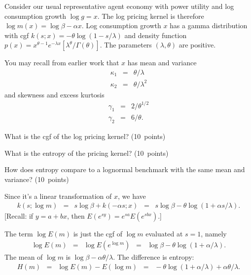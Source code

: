 \documentclass[11pt]{exam}
\begin{document}
\begin{questions}
\begin{solution}
\begin{parts}
\end{parts}
\end{solution}

Consider our usual representative agent economy with power utility
and log consumption growth $ \log g = x$.
The log pricing kernel is therefore $\log m(x) = \log \beta -\alpha x $.
Log consumption growth $x$ has a gamma distribution with
cgf $ k(s; x) = - \theta \log (1-s/\lambda) $
and
density function $p(x) = x^{\theta-1} e^{-\lambda x} [\lambda^\theta/\Gamma(\theta)] $.
The parameters $(\lambda,\theta)$ are positive.

You may recall from earlier work that $x$ has mean and variance
\begin{eqnarray*}
    \kappa_1 &=& \theta /\lambda \\
    \kappa_2 &=& \theta /\lambda^2
\end{eqnarray*}
and skewness and excess kurtosis
\begin{eqnarray*}
    \gamma_1 &=& 2/\theta^{1/2} \\
    \gamma_2 &=& 6/\theta .
\end{eqnarray*}
%
\begin{parts}
\item What is the cgf of the log pricing kernel?
(10~points)
\item What is the entropy of the pricing kernel?
(10~points)
\item How does entropy compare to a lognormal benchmark
with the same mean and variance?
(10~points)
\end{parts}

\begin{solution}
\begin{parts}
\item Since it's a linear transformation of $x$, we have
\begin{eqnarray*}
    k(s; \log m) &=& s \log \beta + k(-\alpha s; x)
        \;\;=\;\; s \log \beta - \theta \log (1 + \alpha s/\lambda) .
\end{eqnarray*}
[Recall: if $y = a + bx$, then
$E(e^{sy}) = e^{sa} E(e^{sbx}) $.]

\item The term $ \log E(m) $ is just the cgf of $\log m$
evaluated at $s = 1$, namely
\begin{eqnarray*}
    \log E(m) &=& \log E (e^{\log m})
            \;\;=\;\; \log \beta - \theta \log (1+\alpha/\lambda) .
\end{eqnarray*}
The mean of $\log m$ is $ \log \beta - \alpha \theta/\lambda $.
The difference is entropy:
\begin{eqnarray*}
    H(m) &=& \log E (m) - E (\log m)
            \;\;=\;\; - \theta \log (1+\alpha/\lambda) + \alpha \theta/\lambda.
\end{eqnarray*}


\end{parts}
\end{solution}
\end{questions}
\end{document}
